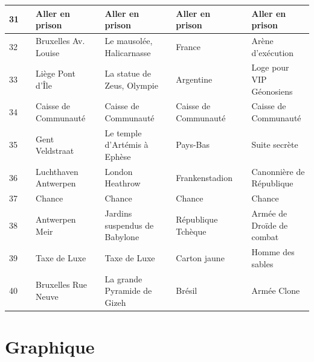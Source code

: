 \documentclass[letterpaper]{article}
\begin{document}
{\begin{tabular}{|l|l|l|l|l|l|l|l|l|}
      31 & \cellcolor[HTML]{BEBEBE} & Aller en prison & \cellcolor[HTML]{BEBEBE} & Aller en prison & \cellcolor[HTML]{BEBEBE} & Aller en prison & \cellcolor[HTML]{BEBEBE} & Aller en prison \\ \hline
      32 & \cellcolor[HTML]{2E8B57} & Bruxelles Av. Louise & \cellcolor[HTML]{2E8B57} & Le mausolée, Halicarnasse & \cellcolor[HTML]{2E8B57} & France & \cellcolor[HTML]{2E8B57} & Arène d'exécution \\ \hline
      33 & \cellcolor[HTML]{2E8B57} & Liège Pont d'Île & \cellcolor[HTML]{2E8B57} & La statue de Zeus, Olympie & \cellcolor[HTML]{2E8B57} & Argentine & \cellcolor[HTML]{2E8B57} & Loge pour VIP Géonosiens \\ \hline
      34 & \cellcolor[HTML]{EEEED1} & Caisse de Communauté & \cellcolor[HTML]{EEEED1} & Caisse de Communauté & \cellcolor[HTML]{EEEED1} & Caisse de Communauté & \cellcolor[HTML]{EEEED1} & Caisse de Communauté \\ \hline
      35 & \cellcolor[HTML]{2E8B57} & Gent Veldstraat & \cellcolor[HTML]{2E8B57} & Le temple d'Artémis à Ephèse & \cellcolor[HTML]{2E8B57} & Pays-Bas & \cellcolor[HTML]{2E8B57} & Suite secrète \\ \hline
      36 & \cellcolor[HTML]{E6E6FA} & Luchthaven Antwerpen & \cellcolor[HTML]{E6E6FA} & London Heathrow & \cellcolor[HTML]{E6E6FA} & Frankenstadion & \cellcolor[HTML]{E6E6FA} & Canonnière de République \\ \hline
      37 & \cellcolor[HTML]{FFC1C1} & Chance & \cellcolor[HTML]{FFC1C1} & Chance & \cellcolor[HTML]{FFC1C1} & Chance & \cellcolor[HTML]{FFC1C1} & Chance \\ \hline
      38 & \cellcolor[HTML]{483D8B} & Antwerpen Meir & \cellcolor[HTML]{483D8B} & Jardins suspendus de Babylone & \cellcolor[HTML]{483D8B} & République Tchèque & \cellcolor[HTML]{483D8B} & Armée de Droïde de combat \\ \hline
      39 & \cellcolor[HTML]{8B1A1A} & Taxe de Luxe & \cellcolor[HTML]{8B1A1A} & Taxe de Luxe & \cellcolor[HTML]{8B1A1A} & Carton jaune & \cellcolor[HTML]{8B1A1A} & Homme des sables \\ \hline
      40 & \cellcolor[HTML]{483D8B} & Bruxelles Rue Neuve & \cellcolor[HTML]{483D8B} & La grande Pyramide de Gizeh &\cellcolor[HTML]{483D8B} & Brésil &\cellcolor[HTML]{483D8B} & Armée Clone\\ \hline
      \end{tabular}
    }
    
    \section{Graphique}
      \label{annexe_graphe}
\end{document}
